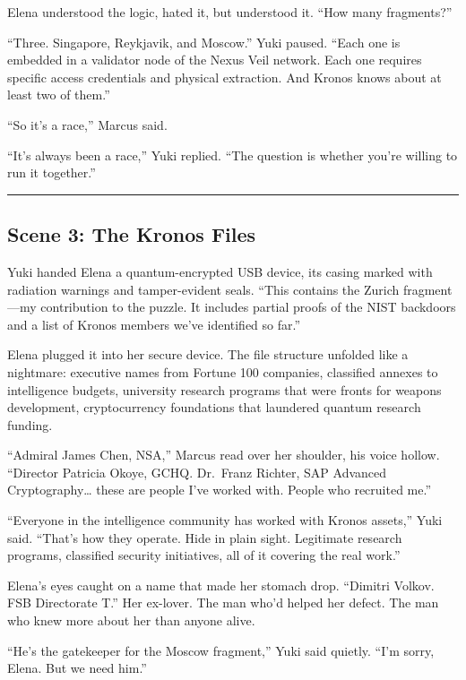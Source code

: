 Elena understood the logic, hated it, but understood it. ``How many fragments?''

``Three. Singapore, Reykjavik, and Moscow.'' Yuki paused. ``Each one is embedded in a validator node of the Nexus Veil network. Each one requires specific access credentials and physical extraction. And Kronos knows about at least two of them.''

``So it's a race,'' Marcus said.

``It's always been a race,'' Yuki replied. ``The question is whether you're willing to run it together.''

\begin{center}\rule{0.5\linewidth}{0.5pt}\end{center}

\hypertarget{scene-3-the-kronos-files}{%
\subsection{Scene 3: The Kronos Files}\label{scene-3-the-kronos-files}}

Yuki handed Elena a quantum-encrypted USB device, its casing marked with radiation warnings and tamper-evident seals. ``This contains the Zurich fragment---my contribution to the puzzle. It includes partial proofs of the NIST backdoors and a list of Kronos members we've identified so far.''

Elena plugged it into her secure device. The file structure unfolded like a nightmare: executive names from Fortune 100 companies, classified annexes to intelligence budgets, university research programs that were fronts for weapons development, cryptocurrency foundations that laundered quantum research funding.

``Admiral James Chen, NSA,'' Marcus read over her shoulder, his voice hollow. ``Director Patricia Okoye, GCHQ. Dr.~Franz Richter, SAP Advanced Cryptography\ldots{} these are people I've worked with. People who recruited me.''

``Everyone in the intelligence community has worked with Kronos assets,'' Yuki said. ``That's how they operate. Hide in plain sight. Legitimate research programs, classified security initiatives, all of it covering the real work.''

Elena's eyes caught on a name that made her stomach drop. ``Dimitri Volkov. FSB Directorate T.'' Her ex-lover. The man who'd helped her defect. The man who knew more about her than anyone alive.

``He's the gatekeeper for the Moscow fragment,'' Yuki said quietly. ``I'm sorry, Elena. But we need him.''

